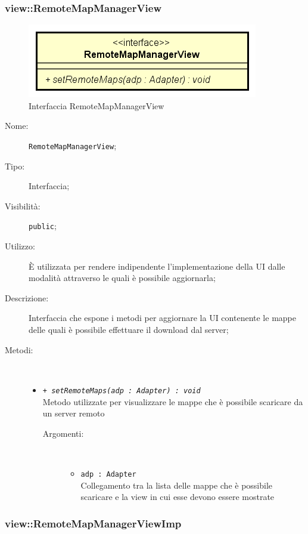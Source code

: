 \documentclass[../DefinizioneDiProdotto.tex]{subfiles}
\begin{document}
\subsubsection{view::RemoteMapManagerView}

    \begin{figure}[H]
        \centering
        \includegraphics{img/RemoteMapManagerView.png}
        \caption{Interfaccia RemoteMapManagerView}\label{fig:view::RemoteMapManagerView} 
    \end{figure}
    \begin{description}
\item[Nome:] \texttt{RemoteMapManagerView};
\item[Tipo:] Interfaccia;
\item[Visibilità:] \texttt{public};
\item[Utilizzo:] È utilizzata per rendere indipendente l'implementazione della UI dalle modalità attraverso le quali è possibile aggiornarla;
\item[Descrizione:] Interfaccia che espone i metodi per aggiornare la UI contenente le mappe delle quali è possibile effettuare il download dal server;
\item[Metodi:] \
\begin{itemize}
\item \texttt{+ \textit{setRemoteMaps(adp : Adapter) : void}}\\
Metodo utilizzate per visualizzare le mappe che è possibile scaricare da un server remoto
 \begin{description}
\item[Argomenti:] \
\begin{itemize}
\item \texttt{adp : Adapter}\\
Collegamento tra la lista delle mappe che è possibile scaricare e la view in cui esse devono essere mostrate\end{itemize}
\end{description}
\end{itemize}
\end{description}

\subsubsection{view::RemoteMapManagerViewImp}
\end{document}
